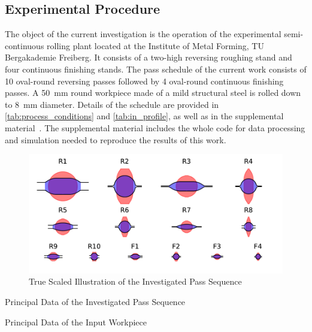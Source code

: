\subsection{Experimental Procedure}\label{subsec:experimental-procedure}

The object of the current investigation is the operation of the experimental semi-continuous rolling plant located at the Institute of Metal Forming, TU Bergakademie Freiberg.
It consists of a two-high reversing roughing stand and four continuous finishing stands.
The pass schedule of the current work consists of 10 oval-round reversing passes followed by 4 oval-round continuous finishing passes.
A \qty{50}{\milli\meter} round workpiece made of a mild structural steel is rolled down to \qty{8}{\milli\meter} diameter.
Details of the schedule are provided in \autoref{tab:process_conditions} and \autoref{tab:in_profile}, as well as in the supplemental material~\cite{WeinerVariationSupplemental2023}.
The supplemental material includes the whole code for data processing and simulation needed to reproduce the results of this work.

\begin{figure}
    \centering
    \includegraphics{img/plot_pass_sequence}
    \caption{True Scaled Illustration of the Investigated Pass Sequence}
    \label{fig:plot_pass_sequence}
\end{figure}


\begin{table}
    \centering
    \caption{Principal Data of the Investigated Pass Sequence}
    \label{tab:process_conditions}
    
\end{table}



\begin{table}
    \centering
    \caption{Principal Data of the Input Workpiece}
    \label{tab:in_profile}
    
\end{table}

